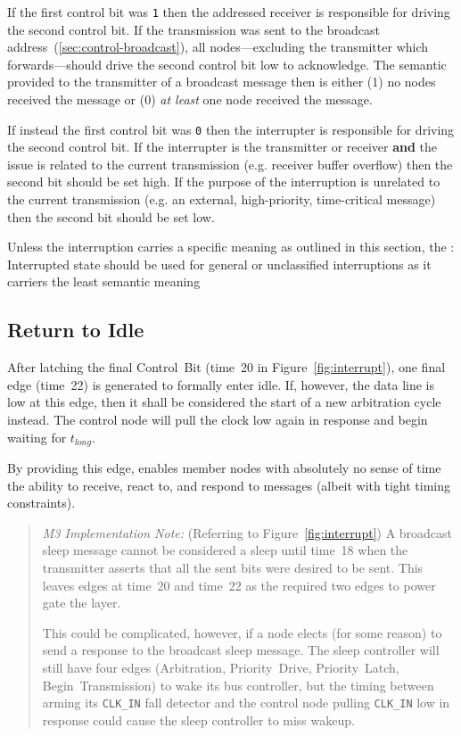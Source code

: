 If the first control bit was {\tt 1} then the addressed receiver is
responsible for driving the second control bit. If the transmission was sent
to the broadcast address~(\ref{sec:control-broadcast}), all nodes---excluding
the transmitter which forwards---should drive the second control bit low to
acknowledge. The semantic provided to the transmitter of a broadcast message
then is either (1) no nodes received the message or (0) {\em at least} one
node received the message.

If instead the first control bit was {\tt 0} then the interrupter is
responsible for driving the second control bit. If the interrupter is the
transmitter or receiver {\bf and} the issue is related to the current
transmission (e.g. receiver buffer overflow) then the second bit should be set
high. If the purpose of the interruption is unrelated to the current
transmission (e.g. an external, high-priority, time-critical message) then the
second bit should be set low.

Unless the interruption carries a specific meaning as outlined in this
section, the {: Interrupted} state should be used for general or
unclassified interruptions as it carriers the least semantic meaning

\subsection{Return to Idle}
After latching the final Control~Bit (time~20 in
Figure~\ref{fig:interrupt}), one final edge (time~22) is generated to formally
enter {\sc idle}. If, however, the data line is low at this edge, then it
shall be considered the start of a new arbitration cycle instead. The control
node will pull the clock low again in response and begin waiting for
$t_{long}$.

By providing this edge, \bus enables member nodes with absolutely no sense of
time the ability to receive, react to, and respond to messages (albeit with
tight timing constraints).

\begin{quote}
\textit{M3 Implementation Note:} (Referring to
Figure~\ref{fig:interrupt}) A broadcast sleep message cannot be considered a
sleep until time~18 when the transmitter asserts that all the sent bits were
desired to be sent. This leaves edges at time~20 and time~22 as the required
two edges to power gate the layer.

This could be complicated, however, if a node elects (for some reason) to send
a response to the broadcast sleep message. The sleep controller will still
have four edges (Arbitration, Priority~Drive, Priority~Latch,
Begin~Transmission) to wake its bus controller, but the timing between arming
its {\tt CLK\_IN} fall detector and the control node pulling {\tt CLK\_IN} low
in response could cause the sleep controller to miss wakeup.
\end{quote}
